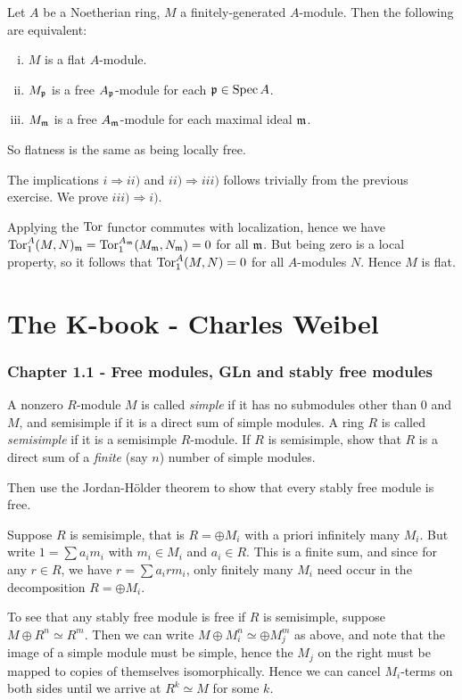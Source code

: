 \documentclass[11pt, english]{article}
\begin{document}
\begin{exc}[Exercise 16]
 Let $A$ be a Noetherian ring, $M$ a finitely-generated $A$-module. Then the following are equivalent:
 \begin{enumerate}[i)]
 \item $M$ is a flat $A$-module.
\item $M_{\mathfrak{p}}$ is a free $A_{\mathfrak{p}}$-module for each $\mathfrak{p} \in \operatorname{Spec} A$.
\item $M_{\mathfrak{m}}$ is a free $A_{\mathfrak{m}}$-module for each maximal ideal $\mathfrak{m}$.
 \end{enumerate}

So flatness is the same as being locally free.
\end{exc}
\begin{sol}
 The implications $i \Rightarrow ii)$ and $ii) \Rightarrow iii)$ follows trivially from the previous exercise. We prove $iii) \Rightarrow i)$. 

Applying the $\operatorname{\mathrm{Tor}}$ functor commutes with localization, hence we have $\operatorname{\mathrm{Tor}}_1^A(M,N)_{\mathfrak{m}} = \operatorname{\mathrm{Tor}}_1^{A_{\mathfrak{m}}}(M_{\mathfrak{m}}, N_{\mathfrak{m}})=0$ for all $\mathfrak{m}$. But being zero is a local property, so it follows that $\operatorname{\mathrm{Tor}}_1^A(M,N)=0$ for all $A$-modules $N$. Hence $M$ is flat.
\end{sol}

\section{The K-book - Charles Weibel}

\subsubsection{Chapter 1.1 - Free modules, GLn and stably free modules}

\begin{exc}

A nonzero $R$-module $M$ is called \emph{simple} if it has no submodules other than $0$ and $M$, and semisimple if it is a direct sum of simple modules. A ring $R$ is called \emph{semisimple} if it is a semisimple $R$-module. If $R$ is semisimple, show that $R$ is a direct sum of a \emph{finite} (say $n$) number of simple modules.

Then use the Jordan-Hölder theorem to show that every stably free module is free.  
\end{exc}
\begin{sol}
Suppose $R$ is semisimple, that is $R = \oplus M_i$ with a priori infinitely many $M_i$. But write $1 = \sum a_im_i$ with $m_i \in M_i$ and $a_i \in R$. This is a finite sum, and since for any $r \in R$, we have $r = \sum a_irm_i$, only finitely many $M_i$ need occur in the decomposition $R=\oplus M_i$. 

To see that any stably free module is free if $R$ is semisimple, suppose $M \oplus R^n \simeq R^m$. Then we can write $M \oplus M_i^n \simeq \oplus M_j^m$ as above, and note that the image of a simple module must be simple, hence the $M_j$ on the right must be mapped to copies of themselves isomorphically. Hence we can cancel $M_i$-terms on both sides until we arrive at $R^k \simeq M$ for some $k$.
\end{sol}
\end{document}
